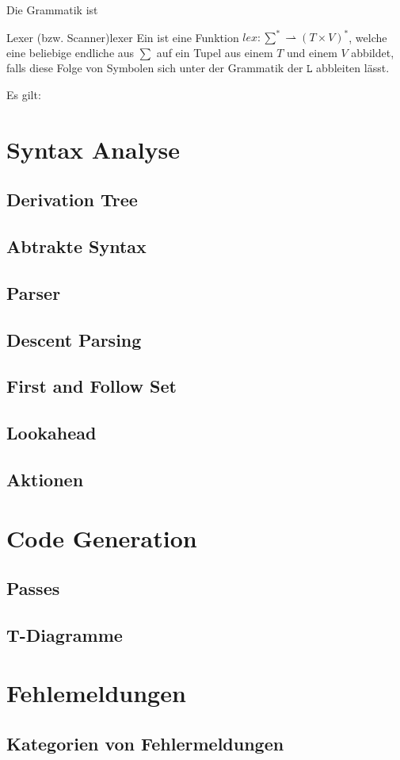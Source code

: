 Die Grammatik ist

\begin{Definition}{Lexer (bzw. Scanner)}{lexer}%
  Ein  ist eine  Funktion \hspace{0.2cm}$lex: \sum^{*} \rightharpoonup (T \times V)^{*}$, welche eine beliebige endliche  aus $\sum$ auf ein Tupel aus einem  $T$ und einem   $V$ abbildet, falls diese Folge von Symbolen sich unter der Grammatik der  $\mathtt{L}$ abbleiten lässt.
\end{Definition}

Es gilt:

\section{Syntax Analyse}
\subsection{Derivation Tree}
\subsection{Abtrakte Syntax}
\subsection{Parser}
\subsection{Descent Parsing}
\subsection{First and Follow Set}
\subsection{Lookahead}
\subsection{Aktionen}
\section{Code Generation}
\subsection{Passes}
\subsection{T-Diagramme}
\section{Fehlemeldungen}
\subsection{Kategorien von Fehlermeldungen}
